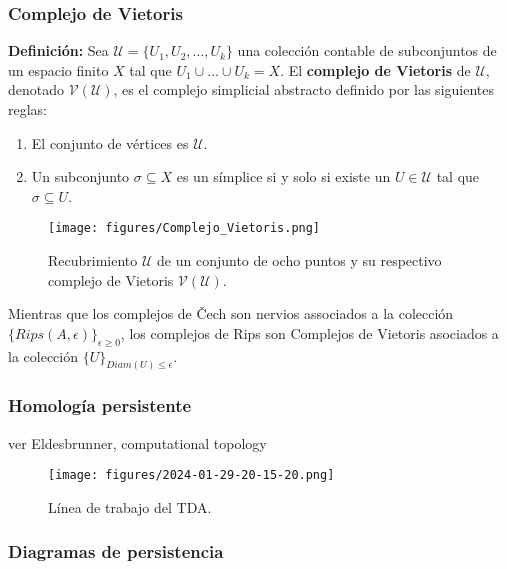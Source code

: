 \documentclass[a4paper,11pt]{article}
\begin{document}
\subsubsection*{Complejo de Vietoris}
\textbf{Definición:} Sea $\mathcal{U}=\{U_{1}, U_{2}, ... ,U_{k}\}$ una colección contable de subconjuntos de un espacio finito $X$ tal que $U_{1}\cup ... \cup U_{k}=X$. El \textbf{complejo de Vietoris} de $\mathcal{U}$, denotado \textbf{$\mathcal{V}(\mathcal{U})$}, es el complejo simplicial abstracto definido por las siguientes reglas:
\begin{enumerate}
    \item El conjunto de vértices es $\mathcal{U}$.
    \item Un subconjunto $\sigma \subseteq X$ es un símplice si y solo si existe un $U \in \mathcal{U}$ tal que $\sigma \subseteq U$.
\end{enumerate}
\begin{figure}[!htb]
  \centering
  \texttt{[image: figures/Complejo\_Vietoris.png]}
  \caption{Recubrimiento $\mathcal{U}$ de un conjunto de ocho puntos y su respectivo complejo de Vietoris $\mathcal{V}(\mathcal{U})$.}
\end{figure}
Mientras que los complejos de Čech son nervios associados a la colección $\{Rips(A,\epsilon)\}_{\epsilon \geq 0}$, los complejos de Rips son Complejos de Vietoris asociados a la colección $\{U\}_{Diam(U)\leq \epsilon}$.



\subsubsection{Homología persistente}

ver Eldesbrunner, computational topology

\begin{figure}[!htb]
    \centering
    \texttt{[image: figures/2024-01-29-20-15-20.png]}
    \caption{Línea de trabajo del TDA.}%
\end{figure}





\subsubsection{Diagramas de persistencia}
\end{document}
